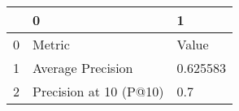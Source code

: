 \begin{tabular}{lll}
\toprule
{} &                       0 &         1 \\
\midrule
0 &                  Metric &     Value \\
1 &       Average Precision &  0.625583 \\
2 &  Precision at 10 (P@10) &       0.7 \\
\bottomrule
\end{tabular}

